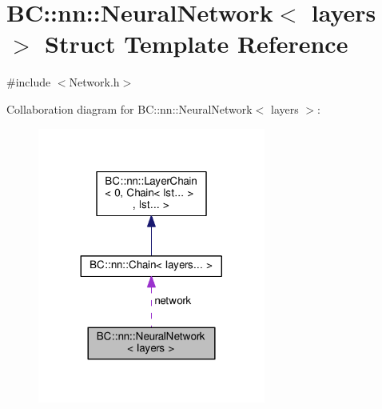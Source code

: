\hypertarget{structBC_1_1nn_1_1NeuralNetwork}{}\section{BC\+:\+:nn\+:\+:Neural\+Network$<$ layers $>$ Struct Template Reference}
\label{structBC_1_1nn_1_1NeuralNetwork}


{\ttfamily \#include $<$Network.\+h$>$}



Collaboration diagram for BC\+:\+:nn\+:\+:Neural\+Network$<$ layers $>$\+:
\nopagebreak
\begin{figure}[H]
\begin{center}
\leavevmode
\includegraphics[width=212pt]{structBC_1_1nn_1_1NeuralNetwork__coll__graph}
\end{center}
\end{figure}
